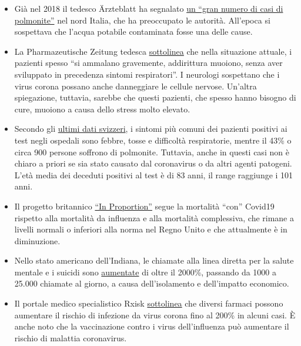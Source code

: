 \begin{itemize}
{  i decessi positivi ai test dalla medicina legale} per poter contare
  solo i ``veri'' decessi corona. Di conseguenza, il numero dei morti è
  già quasi dimezzato rispetto alle cifre dell'Istituto Robert Koch.
\item
  Già nel 2018 il tedesco Ärzteblatt ha segnalato
  \href{https://www.aerzteblatt.de/nachrichten/97750/Vielzahl-an-Lungenentzuendungen-beunruhigen-Behoerden-in-Norditalien}{un
  ``gran numero di casi di polmonite''} nel nord Italia, che ha
  preoccupato le autorità. All'epoca si sospettava che l'acqua potabile
  contaminata fosse una delle cause.
\item
  La Pharmazeutische Zeitung tedesca
  \href{https://www.pharmazeutische-zeitung.de/atemstillstand-koennte-auch-zentrale-ursache-haben-116664/}{sottolinea}
  che nella situazione attuale, i pazienti spesso ``si ammalano
  gravemente, addirittura muoiono, senza aver sviluppato in precedenza
  sintomi respiratori''. I neurologi sospettano che i virus corona
  possano anche danneggiare le cellule nervose. Un'altra spiegazione,
  tuttavia, sarebbe che questi pazienti, che spesso hanno bisogno di
  cure, muoiono a causa dello stress molto elevato.
\item
  Secondo gli
  \href{https://www.bag.admin.ch/dam/bag/de/dokumente/mt/k-und-i/aktuelle-ausbrueche-pandemien/2019-nCoV/covid-19-lagebericht.pdf.download.pdf/COVID-19_Epidemiologische_Lage_Schweiz.pdf}{ultimi
  dati svizzeri}, i sintomi più comuni dei pazienti positivi ai test
  negli ospedali sono febbre, tosse e difficoltà respiratorie, mentre il
  43\% o circa 900 persone soffrono di polmonite. Tuttavia, anche in
  questi casi non è chiaro a priori se sia stato causato dal coronavirus
  o da altri agenti patogeni. L'età media dei deceduti positivi al test
  è di 83 anni, il range raggiunge i 101 anni.
\item
  Il progetto britannico \href{http://inproportion2.talkigy.com/}{``In
  Proportion''} segue la mortalità ``con'' Covid19 rispetto alla
  mortalità da influenza e alla mortalità complessiva, che rimane a
  livelli normali o inferiori alla norma nel Regno Unito e che
  attualmente è in diminuzione.
\item
  Nello stato americano dell'Indiana, le chiamate alla linea diretta per
  la salute mentale e i suicidi sono
  \href{https://twitter.com/JesseKellyDC/status/1246449878219145216}{aumentate}
  di oltre il 2000\%, passando da 1000 a 25.000 chiamate al giorno, a
  causa dell'isolamento e dell'impatto economico.
\item
  Il portale medico specialistico Rxisk
  \href{https://rxisk.org/medications-compromising-covid-infections/}{sottolinea}
  che diversi farmaci possono aumentare il rischio di infezione da virus
  corona fino al 200\% in alcuni casi. È anche noto che la vaccinazione
  contro i virus dell'influenza può aumentare il rischio di malattia
  coronavirus.
\end{itemize}


